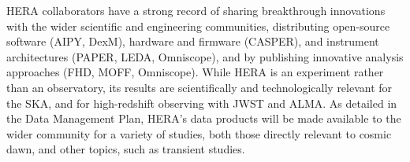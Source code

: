 \documentclass[preprint]{aastex}
\newcommand{\compress}{\vspace{-0.3in}}
\begin{document}
HERA collaborators have a strong record of sharing breakthrough
innovations with the wider scientific and engineering communities, distributing 
open-source software (AIPY, DexM), hardware and firmware (CASPER), 
and instrument architectures (PAPER, LEDA, Omniscope),
and by publishing innovative analysis approaches (FHD, MOFF,
Omniscope).  While HERA is an experiment rather than an observatory, its
results are scientifically and technologically relevant for the
SKA, and for high-redshift observing with JWST and ALMA.
As detailed in the Data Management Plan, HERA's data products will be made available to the wider
community for a variety of studies, both those directly
relevant to cosmic dawn, and other topics, such as transient studies. 



\end{document}
